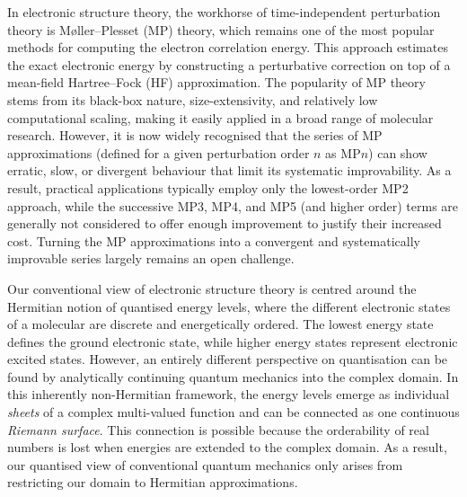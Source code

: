 \documentclass[aps,prb,reprint,noshowkeys,superscriptaddress]{revtex4-1}
\newcommand{\hugh}[1]{\textcolor{hughgreen}{#1}}
\newcommand{\trashHB}[1]{\textcolor{orange}{\sout{#1}}}
\begin{document}
In electronic structure theory, the workhorse of time-independent perturbation theory is M\o{}ller--Plesset (MP) %
theory,\cite{Moller_1934} which remains one of the most popular methods for computing the electron 
correlation energy.\cite{Wigner_1934,Lowdin_1958}
This approach estimates the exact electronic energy by constructing a perturbative correction on top
of a mean-field Hartree--Fock (HF) approximation.\cite{SzaboBook}
The popularity of MP theory stems from its black-box nature, size-extensivity, and relatively low computational scaling, 
making it easily applied in a broad range of molecular research.\cite{HelgakerBook}
However, it is now widely recognised that the series of MP approximations (defined for a given perturbation
order $n$ as MP$n$) can show erratic, slow, or divergent behaviour that limit its systematic improvability.%
\cite{Laidig_1985,Knowles_1985,Handy_1985,Gill_1986,Laidig_1987,Nobes_1987,Gill_1988,Gill_1988a,Lepetit_1988} 
As a result, practical applications typically employ only the lowest-order MP2 approach, while 
the successive MP3, MP4, and MP5 (and higher order) terms are generally not considered to offer enough improvement
to justify their increased cost.
Turning the MP approximations into a convergent and 
systematically improvable series largely remains an open challenge.

Our conventional view of electronic structure theory is centred around the Hermitian notion of quantised energy levels,
where the different electronic states of a molecular are discrete and energetically ordered.
The lowest energy state defines the ground electronic state, while higher energy states
represent electronic excited states.
However, an entirely different perspective on quantisation can be found by analytically continuing
quantum mechanics into the complex domain.
In this inherently non-Hermitian framework, the energy levels emerge as individual \textit{sheets} of a complex
multi-valued function and can be connected as one continuous \textit{Riemann surface}.\cite{BenderPTBook}
This connection is possible because the orderability of real numbers is lost when energies are extended to the
complex domain.
As a result, our quantised view of conventional quantum mechanics only arises from
restricting our domain to Hermitian approximations.
\end{document}
